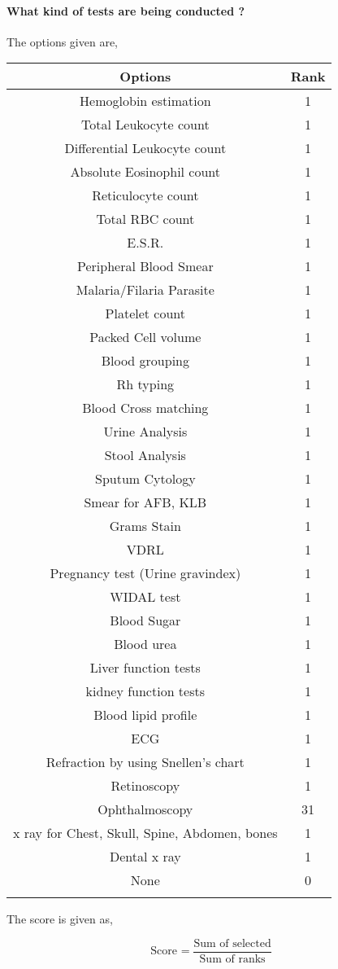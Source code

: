 \documentclass[oneside]{article}
\newcommand{\tsub}[2]{\text{#1}_{\text{#2}}}
\newcommand{\dsub}[2]{\dfrac{\text{#1}}{\text{#2}}}
\newcommand{\multsel}[1]
{
	\[
		\tsub{Score}{#1} = \dsub{Sum of selected}{Sum of ranks}
	\]
}
\newenvironment{ttable}
{
\begin{center}
\begin{tabular}{c|c}
\hline
}
{
\\ \hline
\end{tabular}
\end{center}
}
\begin{document}
\paragraph{ What kind of tests are being conducted ?}
The options given are,
\begin{ttable}
Options & Rank \\ \hline
Hemoglobin estimation & 1 \\
Total Leukocyte count & 1 \\
Differential Leukocyte count & 1 \\
Absolute Eosinophil count & 1 \\
Reticulocyte count & 1 \\
Total RBC count & 1 \\
E.S.R. & 1 \\
Peripheral Blood Smear & 1 \\
Malaria/Filaria Parasite & 1 \\
Platelet count & 1 \\
Packed Cell volume & 1 \\
Blood grouping & 1 \\
Rh typing & 1 \\
Blood Cross matching & 1 \\
Urine Analysis & 1 \\
Stool Analysis & 1 \\
Sputum Cytology & 1 \\
Smear for AFB, KLB & 1 \\
Grams Stain & 1 \\
VDRL & 1 \\
Pregnancy test (Urine gravindex) & 1 \\
WIDAL test & 1 \\
Blood Sugar & 1 \\
Blood urea & 1 \\
Liver function tests & 1 \\
kidney function tests & 1 \\
Blood lipid profile & 1 \\
ECG & 1 \\
Refraction by using Snellen's chart & 1 \\
Retinoscopy & 1 \\
Ophthalmoscopy & 31 \\
x ray for Chest, Skull, Spine, Abdomen, bones & 1 \\
Dental x ray & 1 \\
None & 0 \\
\hline
\end{ttable}
The score is given as,
\multsel{}
\end{document}

